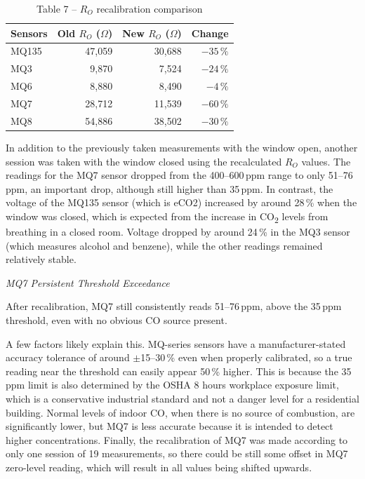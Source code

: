 \vspace{12pt}
\begin{table}[H]
  \centering
  \caption{Table 7 -- $R_O$ recalibration comparison}
  \label{tab:ro-recalibration}
  \renewcommand{\arraystretch}{1.3}
  \begin{tabular}{lrrr}
    \toprule
    \textbf{Sensors} & \textbf{Old $R_O$ ($\Omega$)} & \textbf{New $R_O$ ($\Omega$)} & \textbf{Change} \\
    \midrule
    MQ135 & 47{,}059 & 30{,}688 & $-35\,\%$ \\
    MQ3   &  9{,}870 &  7{,}524 & $-24\,\%$ \\
    MQ6   &  8{,}880 &  8{,}490 & $-4\,\%$  \\
    MQ7   & 28{,}712 & 11{,}539 & $-60\,\%$ \\
    MQ8   & 54{,}886 & 38{,}502 & $-30\,\%$ \\
    \bottomrule
  \end{tabular}
\end{table}
\vspace{12pt}

In addition to the previously taken measurements with the window open, another session was
taken with the window closed using the recalculated $R_O$ values. The readings for the MQ7
sensor dropped from the 400--600\,ppm range to only 51--76\,ppm, an important drop, although
still higher than 35\,ppm. In contrast, the voltage of the MQ135 sensor (which is eCO2)
increased by around 28\,\% when the window was closed, which is expected from the increase in
CO\textsubscript{2} levels from breathing in a closed room. Voltage dropped by around 24\,\%
in the MQ3 sensor (which measures alcohol and benzene), while the other readings remained
relatively stable.

\textit{MQ7 Persistent Threshold Exceedance}

After recalibration, MQ7 still consistently reads 51--76\,ppm, above the 35\,ppm threshold,
even with no obvious CO source present.

A few factors likely explain this. MQ-series sensors have a manufacturer-stated accuracy
tolerance of around $\pm$15--30\,\% even when properly calibrated, so a true reading near the
threshold can easily appear 50\,\% higher. This is because the 35\,ppm limit is also determined
by the OSHA 8 hours workplace exposure limit, which is a conservative industrial standard and
not a danger level for a residential building. Normal levels of indoor CO, when there is no
source of combustion, are significantly lower, but MQ7 is less accurate because it is intended
to detect higher concentrations. Finally, the recalibration of MQ7 was made according to only
one session of 19 measurements, so there could be still some offset in MQ7 zero-level reading,
which will result in all values being shifted upwards.

